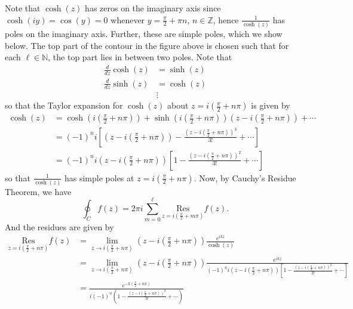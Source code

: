 \documentclass{article}
\newcommand{\Res}[1]{\underset{z = #1}{\text{Res}}}
\begin{document}
\begin{itemize}
\begin{itemize}
        Note that $\cosh(z)$ has zeros on the imaginary axis since $\cosh(iy) = \cos(y) = 0$ whenever $y = \frac{\pi}{2} + \pi n$, $n \in \mathbb{Z}$, hence $\frac{1}{\cosh(z)}$ has poles on the imaginary axis. Further, these are simple poles, which we show below. The top part of the contour in the figure above is chosen such that for each $\ell \in \mathbb{N}$, the top part lies in between two poles. Note that 
        \begin{align*}
            \frac{d}{dz} \cosh(z) &= \sinh(z)\\
            \frac{d}{dz} \sinh(z) &= \cosh(z)\\
            &\vdots
        \end{align*}
        so that the Taylor expansion for $\cosh(z)$ about $z = i(\frac{\pi}{2} + n \pi)$ is given by
        \begin{align*}
            \cosh(z) &= \cosh\left(i\left(\frac{\pi}{2} + n\pi\right)\right) + \sinh\left(i\left(\frac{\pi}{2} + n\pi\right)\right)\left(z - i\left(\frac{\pi}{2} + n\pi\right)\right) + \cdots\\
            &= (-1)^ni\left[\left(z - i\left(\frac{\pi}{2} + n\pi\right)\right) - \frac{\left(z - i\left(\frac{\pi}{2} + n\pi\right)\right)^3}{3!} + \cdots\right]\\
            &= (-1)^ni\left(z - i\left(\frac{\pi}{2} + n\pi\right)\right)\left[1 - \frac{\left(z - i\left(\frac{\pi}{2} + n\pi\right)\right)^2}{3!} + \cdots\right]
        \end{align*}
        so that $\frac{1}{\cosh(z)}$ has simple poles at $z = i\left(\frac{\pi}{2} + n\pi\right)$. Now, by Cauchy's Residue Theorem, we have
        \[\oint_Cf(z) = 2\pi i \sum_{m = 0}^{\ell} \Res{i\left(\frac{\pi}{2} + m\pi\right)}f(z).\]
        And the residues are given by
        \begin{align*}
            \Res{i\left(\frac{\pi}{2} + n\pi\right)}f(z) &= \lim_{z \to i\left(\frac{\pi}{2} + n\pi\right)}\left(z - i\left(\frac{\pi}{2} + n\pi\right)\right)\frac{e^{ikz}}{\cosh(z)}\\
            &= \lim_{z \to i\left(\frac{\pi}{2} + n\pi\right)}\left(z - i\left(\frac{\pi}{2} + n\pi\right)\right)\frac{e^{ikz}}{(-1)^ni\left(z - i\left(\frac{\pi}{2} + n\pi\right)\right)\left[1 - \frac{\left(z - i\left(\frac{\pi}{2} + n\pi\right)\right)^2}{3!} + \cdots\right]}\\
            &= \frac{e^{-k\left(\frac{\pi}{2} + n\pi\right)}}{i(-1)^n\left(1 - \frac{\left(z - i\left(\frac{\pi}{2} + n \pi\right)\right)^2}{3!} + \cdots\right)}\\

\end{align*}
\end{itemize}
\end{itemize}
\end{document}

